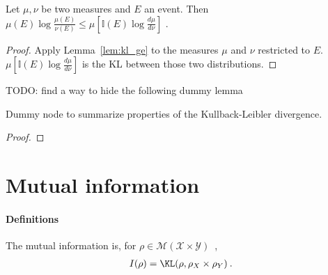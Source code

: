 \begin{lemma}
  \label{lem:expectation_llr_event}
  Let $\mu, \nu$ be two measures and $E$ an event. Then
  $\mu(E)\log\frac{\mu(E)}{\nu(E)} \le \mu\left[\mathbb{I}(E)\log \frac{d \mu}{d \nu}\right]$ .
\end{lemma}

\begin{proof}
Apply Lemma~\ref{lem:kl_ge} to the measures $\mu$ and $\nu$ restricted to $E$. $\mu\left[\mathbb{I}(E)\log \frac{d \mu}{d \nu}\right]$ is the KL between those two distributions.
\end{proof}




TODO: find a way to hide the following dummy lemma
\begin{lemma}
  \label{lem:kl_properties}
  \leanok
  Dummy node to summarize properties of the Kullback-Leibler divergence.
\end{lemma}

\begin{proof}\leanok
{}
\end{proof}


\section{Mutual information}

\paragraph{Definitions}

\begin{definition}
  \label{def:mutualInfo}
  The mutual information is, for $\rho \in \mathcal M(\mathcal X \times \mathcal Y)$~,
  \begin{align*}
  I(\rho) = \KL(\rho, \rho_X \times \rho_Y) \: .
  \end{align*}
\end{definition}


